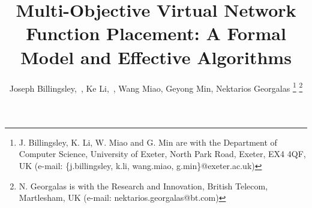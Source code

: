 \documentclass[journal]{IEEEtran}
\begin{document}
%
\title{Multi-Objective Virtual Network Function Placement: A Formal Model and Effective Algorithms}
%
%
\author{
	Joseph Billingsley,~,
	Ke Li,~,
	Wang Miao,
	Geyong Min,
	Nektarios Georgalas
	\thanks{J. Billingsley, K. Li, W. Miao and G. Min are with the Department of Computer Science, University of Exeter, North Park Road, Exeter, EX4 4QF, UK (e-mail: \{j.billingsley, k.li, wang.miao, g.min\}@exeter.ac.uk)}
	\thanks{N. Georgalas is with the Research and Innovation, British Telecom, Martlesham, UK (e-mail: nektarios.georgalas@bt.com)}
}

\maketitle

\end{document}
